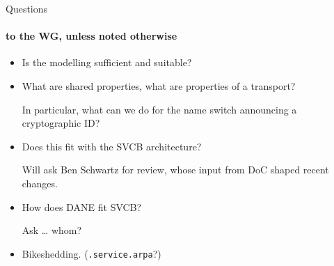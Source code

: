 \begin{frame}{Questions}\framesubtitle{to the WG, unless noted otherwise}\large
    \begin{itemize}
        \item Is the modelling sufficient and suitable?
        \item What are shared properties, what are properties of a transport? %

           In particular, what can we do for the name switch announcing a cryptographic ID?
        \item Does this fit with the SVCB architecture?

            Will ask Ben Schwartz for review, whose input from DoC shaped recent changes.
        \item How does DANE fit SVCB? %

            Ask … whom?
        \item Bikeshedding. (\texttt{.service.arpa}?)
    \end{itemize}
\end{frame}


